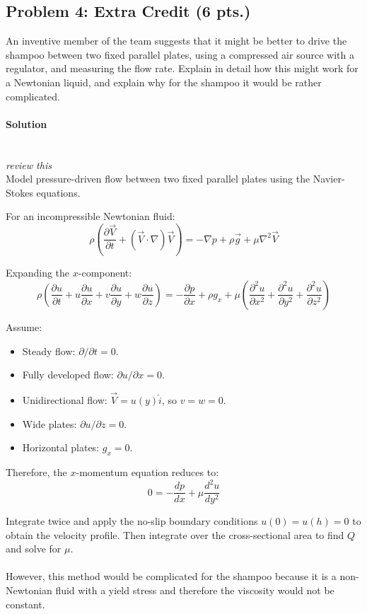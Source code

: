 \documentclass[12pt]{article}
\begin{document}
\subsection*{Problem 4: Extra Credit (6 pts.)}
An inventive member of the team suggests that it might be better to drive the shampoo between two fixed parallel plates, using a compressed air source with a regulator, and measuring the flow rate. Explain in detail how this might work for a Newtonian liquid, and explain why for the shampoo it would be rather complicated.

\paragraph{Solution}\mbox{}\\
\textit{review this}\\
Model pressure-driven flow between two fixed parallel plates using the Navier-Stokes equations.

For an incompressible Newtonian fluid:
\[
\rho\left(\frac{\partial\vec V}{\partial t}
+(\vec V\cdot\nabla)\vec V\right)
=-\nabla p+\rho\vec g+\mu\nabla^2\vec V
\]

Expanding the $x$-component:
\[
\rho\left(
\frac{\partial u}{\partial t}
+u\frac{\partial u}{\partial x}
+v\frac{\partial u}{\partial y}
+w\frac{\partial u}{\partial z}
\right)
=-\frac{\partial p}{\partial x}
+\rho g_x
+\mu\left(
\frac{\partial^2u}{\partial x^2}
+\frac{\partial^2u}{\partial y^2}
+\frac{\partial^2u}{\partial z^2}
\right)
\]

Assume:
\begin{itemize}
    \item Steady flow: $\partial/\partial t=0$.
    \item Fully developed flow: $\partial u/\partial x=0$.
    \item Unidirectional flow: $\vec V=u(y)\hat i$, so $v=w=0$.
    \item Wide plates: $\partial u/\partial z=0$.
    \item Horizontal plates: $g_x=0$.
\end{itemize}

Therefore, the $x$-momentum equation reduces to:
\[
\boxed{0=-\frac{dp}{dx}+\mu\frac{d^2u}{dy^2}}
\]

Integrate twice and apply the no-slip boundary conditions
$u(0)=u(h)=0$ to obtain the velocity profile. Then integrate
over the cross-sectional area to find $Q$ and solve for $\mu$.\\\\
However, this method would be complicated for the shampoo because it is a non-Newtonian fluid with a yield stress and therefore the viscosity would not be constant.
\end{document}

